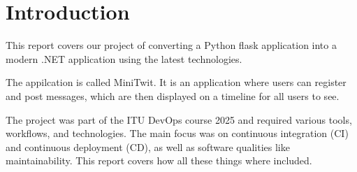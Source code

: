 \section{Introduction}
\label{ch:introduction}

This report covers our project of converting a Python flask application 
into a modern .NET application using the latest technologies.

The appilcation is called MiniTwit. 
It is an application where users can register and post messages, 
which are then displayed on a timeline for all users to see.

The project was part of the ITU DevOps course 2025 and 
required various tools, workflows, and technologies. 
The main focus was on continuous integration (CI) 
and continuous deployment (CD), as well as 
software qualities like maintainability.
This report covers how all these things where included.
